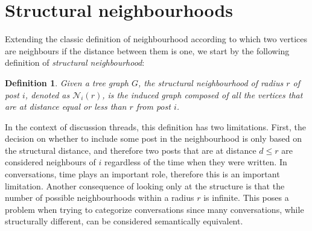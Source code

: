 \documentclass[conference]{IEEEtran}
\newtheorem{definition}{Definition}
\begin{document}




\section{Structural neighbourhoods}
Extending the classic definition of neighbourhood according to which two vertices are neighbours if the distance between them is one, we start by the following definition of \textit{structural neighbourhood}:

\begin{definition}
Given a tree graph $G$, the \textit{structural neighbourhood} of radius $r$ of post $i$, denoted as $\mathcal{N}_i(r)$, is the induced graph composed of all the vertices that are at distance equal or less than $r$ from post $i$.
\end{definition}
In the context of discussion threads, this definition has two limitations. First, the decision on whether to include some post in the neighbourhood is only based on the structural distance, and therefore two posts that are at distance $d\leq r$ are considered neighbours of $i$ regardless of the time when they were written. In conversations, time plays an important role, therefore this is an important limitation. Another consequence of looking only at the structure is that the number of possible neighbourhoods within a radius $r$ is infinite. This poses a problem when trying to categorize conversations since many conversations, while structurally different, can be considered semantically equivalent.
\end{document}

